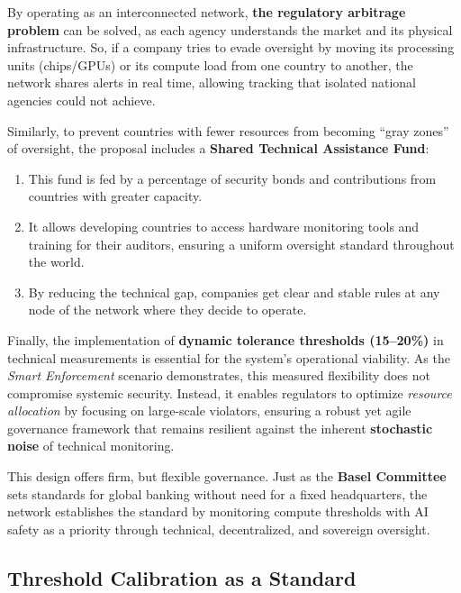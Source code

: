 By operating as an interconnected network, \textbf{the regulatory arbitrage problem} can be solved, as each agency understands the market and its physical infrastructure. So, if a company tries to evade oversight by moving its processing units (chips/GPUs) or its compute load from one country to another, the network shares alerts in real time, allowing tracking that isolated national agencies could not achieve.

Similarly, to prevent countries with fewer resources from becoming ``gray zones'' of oversight, the proposal includes a \textbf{Shared Technical Assistance Fund}:

\begin{enumerate}
    \item This fund is fed by a percentage of security bonds and contributions from countries with greater capacity.
    
    \item It allows developing countries to access hardware monitoring tools and training for their auditors, ensuring a uniform oversight standard throughout the world.
    
    \item By reducing the technical gap, companies get clear and stable rules at any node of the network where they decide to operate.
\end{enumerate}

Finally, the implementation of \textbf{dynamic tolerance thresholds (15--20\%)} in technical measurements is essential for the system’s operational viability. As the \textit{Smart Enforcement} scenario demonstrates, this measured flexibility does not compromise systemic security. Instead, it enables regulators to optimize \textit{resource allocation} by focusing on large-scale violators, ensuring a robust yet agile governance framework that remains resilient against the inherent \textbf{stochastic noise} of technical monitoring.

This design offers firm, but flexible governance. Just as the \textbf{Basel Committee} sets standards for global banking without need for a fixed headquarters, the network establishes the standard by monitoring compute thresholds with AI safety as a priority through technical, decentralized, and sovereign oversight.

\subsection{Threshold Calibration as a Standard}

